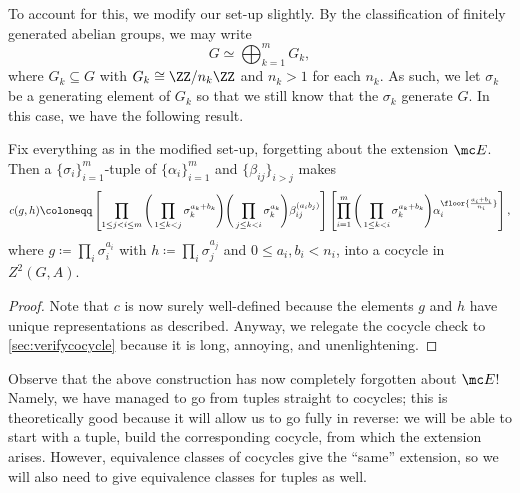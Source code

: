 \documentclass{article}
\numberwithin{equation}{section}
\begin{document}
To account for this, we modify our set-up slightly. By the classification of finitely generated abelian groups, we may write
\[ G\simeq\bigoplus_{k=1}^m G_k,\]
where $ G_k\subseteq G$ with $ G_k\cong\ZZ/n_k\ZZ$ and $n_k>1$ for each $n_k$. As such, we let $\sigma_k$ be a generating element of $ G_k$ so that we still know that the $\sigma_k$ generate $ G$. In this case, we have the following result.
\begin{theorem} \label{thm:getcocycle}
	Fix everything as in the modified set-up, forgetting about the extension $\mc E$. Then a $\{\sigma_i\}_{i=1}^m$-tuple of $\{\alpha_i\}_{i=1}^m$ and $\{\beta_{ij}\}_{i>j}$ makes
	\[c(g,h)\coloneqq\left[\prod_{1\le j<i\le m}\Bigg(\prod_{1\le k<j}\sigma_k^{a_k+b_k}\Bigg)\Bigg(\prod_{j\le k<i}\sigma_k^{a_k}\Bigg)\beta_{ij}^{(a_ib_j)}\right]\left[\prod_{i=1}^m\Bigg(\prod_{1\le k<i}\sigma_k^{a_k+b_k}\Bigg)\alpha_i^{\floor{\frac{a_i+b_i}{n_i}}}\right],\]
	where $g\coloneqq\prod_i\sigma_i^{a_i}$ with $h\coloneqq\prod_i\sigma_j^{a_j}$ and $0\le a_i,b_i<n_i$, into a cocycle in $Z^2( G,A)$.
\end{theorem}
\begin{proof}
	Note that $c$ is now surely well-defined because the elements $g$ and $h$ have unique representations as described. Anyway, we relegate the cocycle check to \autoref{sec:verifycocycle} because it is long, annoying, and unenlightening.
\end{proof}
Observe that the above construction has now completely forgotten about $\mc E$! Namely, we have managed to go from tuples straight to cocycles; this is theoretically good because it will allow us to go fully in reverse: we will be able to start with a tuple, build the corresponding cocycle, from which the extension arises. However, equivalence classes of cocycles give the ``same'' extension, so we will also need to give equivalence classes for tuples as well.
\end{document}
